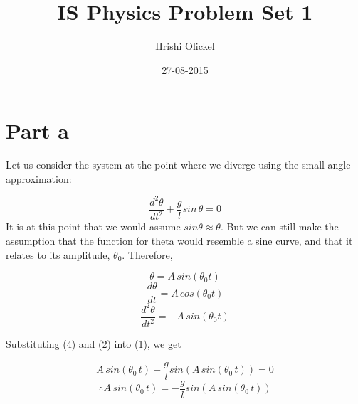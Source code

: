 \documentclass{article}
\title{IS Physics Problem Set 1} \date{27-08-2015} \author{Hrishi Olickel}
\begin{document}
 \maketitle
 \newpage
 
\graphicspath{ {/} }

\lstset{style=MATLAB}

 \section{Part a}

Let us consider the system at the point where we diverge using the small angle approximation:

\begin{equation}
\frac{d^2\theta}{dt^2}+\frac{g}{l} sin\,\theta = 0
\end{equation}
It is at this point that we would assume $sin \theta \approx \theta$. But we can still make the assumption that the function for theta would resemble a sine curve, and that it relates to its amplitude, $\theta _0$. Therefore,

\begin{equation}
\theta = A\,sin(\theta_0 t)
\end{equation}
\begin{equation}
\frac{d\theta}{dt} = A\,cos(\theta_0 t)
\end{equation}
\begin{equation}
\frac{d^2\theta}{dt^2} = - A\,sin(\theta_0 t)
\end{equation}

Substituting (4) and (2) into (1), we get

\begin{equation}
 A\,sin(\theta_0\,t)+\frac{g}{l} sin(A\,sin(\theta_0\,t)) = 0
\end{equation}
\begin{equation}
\therefore  A\,sin(\theta_0\,t)= -\frac{g}{l} sin (A\,sin(\theta_0\,t))
\end{equation}
\end{document}
